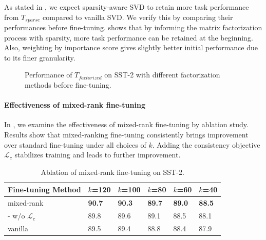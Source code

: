 As stated in , we expect sparsity-aware SVD to retain more task performance from $T_{sparse}$ compared to vanilla SVD. We verify this by comparing their performances before fine-tuning. 
 shows that by informing the matrix factorization process with sparsity, 
more task performance can be retained at the beginning. 
Also, weighting by importance score gives slightly better initial performance due to 
its finer granularity.
\begin{figure}[th]
	\centering
	\caption{Performance of $T_{factorized}$ on SST-2 with different factorization methods before fine-tuning.}
	\label{fig:init}
\end{figure}

\paragraph{Effectiveness of mixed-rank fine-tuning} In , we examine the effectiveness of mixed-rank fine-tuning by ablation study.  Results show that mixed-ranking fine-tuning consistently brings improvement over standard fine-tuning under all choices of $k$. Adding the consistency objective $\mathcal{L}_{c}$  stabilizes training and leads to further improvement. 
\begin{table}[th]
	\centering
	\scriptsize
	\begin{tabular}{l|lllll}
		\toprule
		Fine-tuning Method & $k$=120 & $k$=100 & $k$=80 &$k$=60 & $k$=40 \\
		\midrule
		mixed-rank      & \textbf{90.7}  & \textbf{90.3}  & \textbf{89.7} &\textbf{89.0}  & \textbf{88.5} \\
		- w/o $\mathcal{L}_{c}$    &89.8 &89.6   &89.1  &88.5 &88.1  \\
		\midrule
		vanilla  & 89.5  & 89.4  &88.8  &88.4 & 87.9	 \\
		\bottomrule
	\end{tabular}
	\caption{Ablation of mixed-rank fine-tuning on SST-2.}
	\label{table:wwomixedrank}
\end{table}

